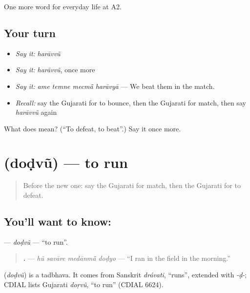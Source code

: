\begin{grammarlens}[title={What you've built}]
One more word for everyday life at A2.
\end{grammarlens}

\subsection*{Your turn}
\begin{itemize}
\raggedright
  \item \emph{Say it:} \emph{harāvvũ}
  \item \emph{Say it:} \emph{harāvvũ}, once more
  \item \emph{Say it:} \emph{ame temne mecmā̃ harāvyā} — We beat them in the match.
  \item \emph{Recall:} say the Gujarati for to bounce, then the Gujarati for match, then say \emph{harāvvũ} again
\end{itemize}

\begin{tcolorbox}[breakable,colback=teal!4,colframe=teal!35!black,title={Before you move on}]
What does  mean? (\textquotedblleft{}To defeat, to beat\textquotedblright{}.) Say it once more.
\end{tcolorbox}
\section[\texorpdfstring{\gu{દોડવું} (doḍvũ)}{દોડવું (doḍvũ)}]{ (doḍvũ) — to run}

\label{lesson:GU-C259-dodvu}



\begin{quote}
Before the new one: say the Gujarati for match, then the Gujarati for to defeat.
\end{quote}

\subsection*{You'll want to know: }
\textbf{} — \emph{doḍvũ} — \textquotedblleft{}to run\textquotedblright{}.

\begin{quote}
\textbf{   .} — \emph{hũ savāre medānmā̃ doḍyo} — \textquotedblleft{}I ran in the field in the morning.\textquotedblright{}
\end{quote}

\begin{cousinweb}
\textbf{} (\emph{doḍvũ}) is a tadbhava. It comes from Sanskrit \emph{drávati}, \textquotedblleft{}runs\textquotedblright{}, extended with \emph{-ḍ-}; CDIAL lists Gujarati \emph{doṛvũ}, \textquotedblleft{}to run\textquotedblright{} (CDIAL 6624).
\end{cousinweb}

